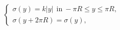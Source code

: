 \begin{equation}
  \left\{ \begin{array}{l}
    \sigma(y)=k|y| ~~\mbox{in}~ -\pi R \leq y \leq\pi R, \\
    \sigma(y+2\pi R)=\sigma(y),
  \end{array} \right.
\label{eq:sigma-orb}
\end{equation}

